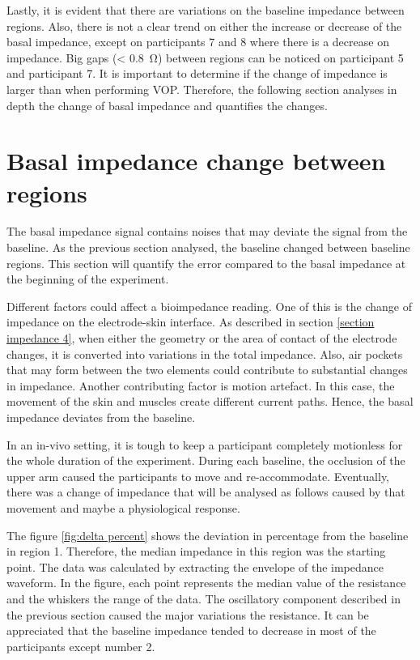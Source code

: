 Lastly, it is evident that there are variations on the baseline impedance between regions. Also, there is not a clear trend on either the increase or decrease of the basal impedance, except on participants 7 and 8 where there is a decrease on impedance. Big gaps (< \SI{0.8}{\ohm}) between regions can be noticed on participant 5 and participant 7. It is important to determine if the change of impedance is larger than when performing VOP. Therefore, the following section analyses in depth the change of basal impedance and quantifies the changes. 

 
\section{Basal impedance change between regions}
\label{senction basal 3.1} 
The basal impedance signal contains noises that may deviate the signal from the baseline. As the previous section analysed, the baseline changed between baseline regions. This section will quantify the error compared to the basal impedance at the beginning of the experiment. 

Different factors could affect a bioimpedance reading. One of this is the change of impedance on the electrode-skin interface.  As described in section \ref{section impedance 4}, when either the geometry or the area of contact of the electrode changes, it is converted into variations in the total impedance. Also, air pockets that may form between the two elements could contribute to substantial changes in impedance.  Another contributing factor is motion artefact. In this case, the movement of the skin and muscles create different current paths. Hence, the basal impedance deviates from the baseline. 

In an in-vivo setting, it is tough to keep a participant completely motionless for the whole duration of the experiment.  During each baseline, the occlusion of the upper arm caused the participants to move and re-accommodate. Eventually, there was a change of impedance that will be analysed as follows caused by that movement and maybe a physiological response. 

The figure \ref{fig:delta percent} shows the deviation in percentage from the baseline in region 1.  Therefore, the median impedance in this region was the starting point. The data was calculated by extracting the envelope of the impedance waveform. In the figure, each point represents the median value of the resistance and the whiskers the range of the data. The oscillatory component described in the previous section caused the major variations the resistance. It can be appreciated that the baseline impedance tended to decrease in most of the participants except number 2. 

